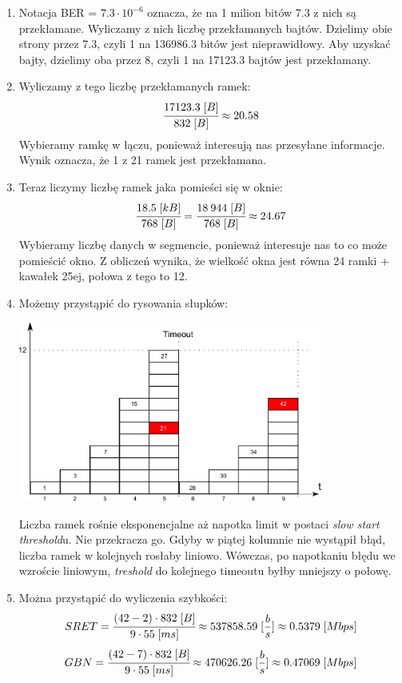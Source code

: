 			\begin{enumerate}
				\item Notacja BER = $ 7.3 \cdot 10 ^ {-6} $ oznacza, że na 1 milion bitów 7.3 z nich są przekłamane. Wyliczamy z nich liczbę przekłamanych bajtów. Dzielimy obie strony przez 7.3, czyli 1 na 136986.3 bitów jest nieprawidłowy. Aby uzyskać bajty, dzielimy oba przez 8, czyli 1 na 17123.3 bajtów jest przekłamany.
				\item Wyliczamy z tego liczbę przekłamanych ramek:
				$$ \cfrac{17123.3\;[B]}{832\;[B]}\approx20.58 $$
				Wybieramy ramkę w łączu, ponieważ interesują nas przesyłane informacje. Wynik oznacza, że 1 z 21 ramek jest przekłamana.
				\item Teraz liczymy liczbę ramek jaka pomieści się w oknie:
				$$ \cfrac{18.5\;[kB]}{768\;[B]}=\cfrac{18\:944\;[B]}{768\;[B]}\approx24.67 $$
				Wybieramy liczbę danych w segmencie, ponieważ interesuje nas to co może pomieścić okno. Z obliczeń wynika, że wielkość okna jest równa 24 ramki + kawałek 25ej, połowa z tego to 12.
				\item Możemy przystąpić do rysowania słupków:
				\begin{center}
					\includegraphics[width=10.0cm]{./images/zadanie16}
				\end{center}
				Liczba ramek rośnie eksponencjalne aż napotka limit w postaci \emph{slow start threshold}u. Nie przekracza go. Gdyby w piątej kolumnie nie wystąpił błąd, liczba ramek w kolejnych rosłaby liniowo. Wówczas, po napotkaniu błędu we wzroście liniowym, \emph{treshold} do kolejnego timeoutu byłby mniejszy o połowę.
				\item Można przystąpić do wyliczenia szybkości:
				$$ SRET=\cfrac{(42-2)\cdot832\;[B]}{9\cdot55\;[ms]}\approx537858.59\;[\frac{b}{s}]\approx0.5379\;[Mbps] $$
				$$ GBN=\cfrac{(42-7)\cdot832\;[B]}{9\cdot55\;[ms]}\approx470626.26\;[\frac{b}{s}]\approx0.47069\;[Mbps]   $$
			\end{enumerate}
				
